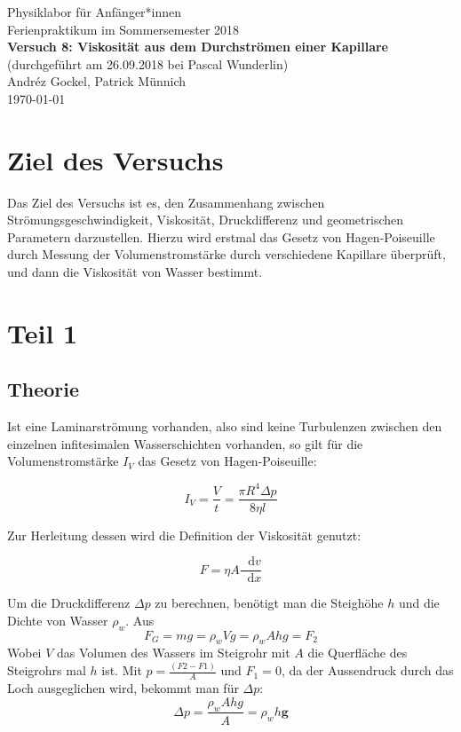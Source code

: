 \documentclass[11pt,a4paper]{article}
\newcommand\dif{\mathop{}\!\mathrm{d}}
\renewcommand{\vec}{\boldsymbol}
\begin{document}
{
\centering 
\large 
Physiklabor für Anf\"anger*innen \\
Ferienpraktikum im Sommersemester 2018 \\[4mm]
\textbf{\LARGE 
Versuch 8: Viskosit\"at aus dem Durchstr\"omen einer Kapillare
} \\[3mm]
(durchgef\"uhrt am 26.09.2018 bei Pascal Wunderlin) \\
Andréz Gockel, Patrick M\"unnich\\
\today \\[10mm]
}

\vspace{50pt}
\tableofcontents
\vspace{22pt}
\listoffigures
\pagebreak

\section{Ziel des Versuchs}

Das Ziel des Versuchs ist es, den Zusammenhang zwischen Str\"omungsgeschwindigkeit, Viskosit\"at, Druckdifferenz und geometrischen Parametern darzustellen. Hierzu wird erstmal das Gesetz von Hagen-Poiseuille durch Messung der Volumenstromst\"arke durch verschiedene Kapillare \"uberpr\"uft, und dann die Viskosit\"at von Wasser bestimmt.

\section{Teil 1}

\subsection{Theorie}

Ist eine Laminarstr\"omung vorhanden, also sind keine Turbulenzen zwischen den einzelnen infitesimalen Wasserschichten vorhanden, so gilt f\"ur die Volumenstromst\"arke $I_V$ das Gesetz von Hagen-Poiseuille:

\begin{equation}
I_V=\frac{V}{t}=\frac{\pi R^4\Delta p}{8\eta l}\label{hagen}
\end{equation}

Zur Herleitung dessen wird die Definition der Viskosit\"at genutzt:

\begin{equation}
F=\eta A\frac{\dif v}{\dif x}
\end{equation}

Um die Druckdifferenz $\Delta p$ zu berechnen, benötigt man die Steighöhe $h$ und die Dichte von Wasser $\rho_w$.
Aus
$$F_G = mg = \rho_w Vg = \rho_w Ahg = F_2$$
Wobei $V$ das Volumen des Wassers im Steigrohr mit $A$ die Querfläche des Steigrohrs mal $h$ ist.
Mit $p = \frac{(F2-F1)}{A}$ und $F_1 = 0$, da der Aussendruck durch das Loch ausgeglichen wird, bekommt man für $\Delta p$:
$$\Delta p = \frac{\rho_w Ahg}{A} = \rho_w h \vec{g}$$
\end{document}
